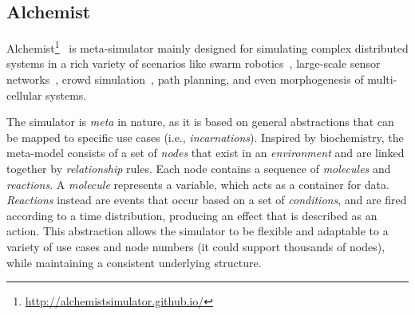 \subsection{Alchemist}\label{coordination2023:alchemist}

Alchemist\footnote{\url{http://alchemistsimulator.github.io/}}~\cite{DBLP:journals/jos/PianiniMV13} is meta-simulator
 mainly designed for simulating complex distributed systems 
 in a rich variety of scenarios like swarm robotics~\cite{Casadei2021},
 large-scale sensor networks~\cite{Aguzzi_2022}, crowd simulation~\cite{Beal2015},
 path planning, and even morphogenesis of multi-cellular systems.

The simulator is \emph{meta} in nature, 
 as it is based on general abstractions 
 that can be mapped to specific use cases (i.e., \emph{incarnations}).
% 
Inspired by biochemistry, 
 the meta-model consists of a set of \emph{nodes} 
 that exist in an \emph{environment} and are linked together by \emph{relationship} rules. 
 Each node contains a sequence of \emph{molecules} and \emph{reactions}. 
%
 A \emph{molecule} represents a variable, 
 which acts as a container for data. 
 \emph{Reactions} instead are events that occur based 
 on a set of \emph{conditions}, 
 and are fired according to a time distribution, 
 producing an effect that is described as an action. 
This abstraction allows the simulator to be flexible 
 and adaptable to a variety of use cases and node numbers 
 (it could support thousands of nodes), 
 while maintaining a consistent underlying structure.

